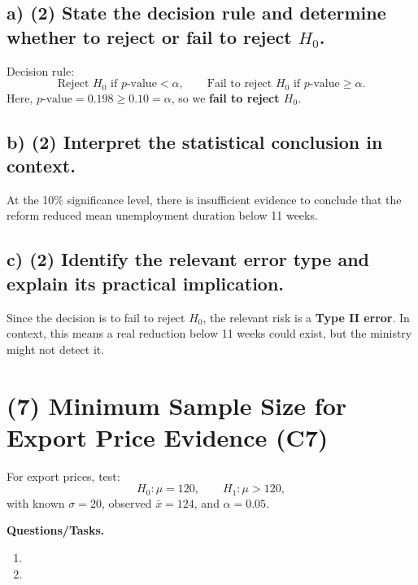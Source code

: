 \subsection*{a) \textbf{(2)} State the decision rule and determine whether to reject or fail to reject \(H_0\).}
\label{subsec:unemployment-duration-claim-decision-c6-a}
Decision rule:
\[
\text{Reject }H_0\text{ if }p\text{-value}<\alpha,
\qquad
\text{Fail to reject }H_0\text{ if }p\text{-value}\ge \alpha.
\]
Here, \(p\text{-value}=0.198\ge0.10=\alpha\), so we \textbf{fail to reject \(H_0\)}.


\subsection*{b) \textbf{(2)} Interpret the statistical conclusion in context.}
\label{subsec:unemployment-duration-claim-decision-c6-b}
At the 10\% significance level, there is insufficient evidence to conclude that the reform reduced mean unemployment duration below 11 weeks.


\subsection*{c) \textbf{(2)} Identify the relevant error type and explain its practical implication.}
\label{subsec:unemployment-duration-claim-decision-c6-c}
Since the decision is to fail to reject \(H_0\), the relevant risk is a \textbf{Type II error}. In context, this means a real reduction below 11 weeks could exist, but the ministry might not detect it.


\section{(7) Minimum Sample Size for Export Price Evidence (C7)}
\label{sec:export-price-minimum-sample-size-c7}
For export prices, test:
\[
H_0:\mu=120,\qquad H_1:\mu>120,
\]
with known \(\sigma=20\), observed \(\bar x=124\), and \(\alpha=0.05\).

\textbf{Questions/Tasks.}
\begin{enumerate}[label=\textbf{\alph*)}]
    \item {}
    \item {}
\end{enumerate}

